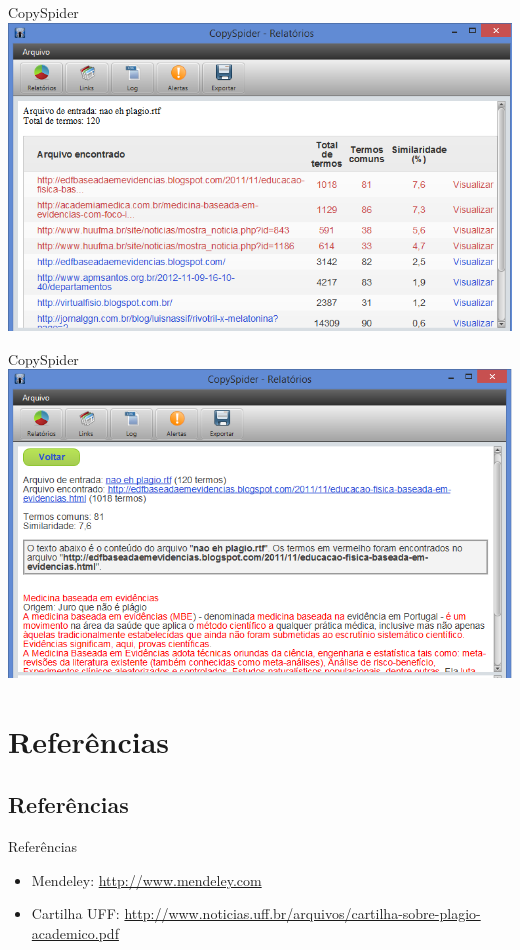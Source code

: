 \documentclass{beamer}
\begin{document}
\begin{frame}{CopySpider}
  \includegraphics[width=\textwidth]{Referencias/copyspider3}
\end{frame}

\begin{frame}{CopySpider}
  \includegraphics[width=\textwidth]{Referencias/copyspider4}
\end{frame}

\section{Referências}

\subsection{Referências}

\begin{frame}{Referências}
  \begin{itemize}
  \item<1-> Mendeley: \url{http://www.mendeley.com}
  \item<1-> Cartilha UFF: \url{http://www.noticias.uff.br/arquivos/cartilha-sobre-plagio-academico.pdf}
  \end{itemize}
\end{frame}
\end{document}
